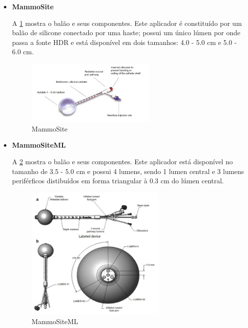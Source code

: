 \documentclass[11pt,a4paper]{article}
\begin{document}
			\begin{itemize}
				\item \textbf{\textcolor{CarnationPink}{MammoSite}}
				
					A    \ref{img:mammosite} mostra o balão e seus componentes. Este aplicador é constituído por um balão de silicone conectado por uma haste; possui um único lúmen por onde passa a fonte HDR e está disponível em dois tamanhos: 4.0 - 5.0 cm e 5.0 - 6.0 cm.

					\begin{figure}[h]
						\centering
						\includegraphics[width=0.6\textwidth]{Imagens/balaoMammoSite.JPG}
						\caption{MammoSite}
						\label{img:mammosite}
					\end{figure}

				\item \textbf{\textcolor{CarnationPink}{MammoSiteML}}
				
					A    \ref{img:mammositeml} mostra o balão e seus componentes. Este aplicador está disponível no tamanho de 3.5 - 5.0 cm e possui 4 lumens, sendo 1 lumen central e 3 lumens periférficos distibuídos em forma triangular à 0.3 cm do lúmen central.

					\begin{figure}[h]
						\centering
						\includegraphics[width=0.65\textwidth]{Imagens/mammositeML.JPG}
						\caption{MammoSiteML}
						\label{img:mammositeml}
					\end{figure}


\end{itemize}
\end{document}
